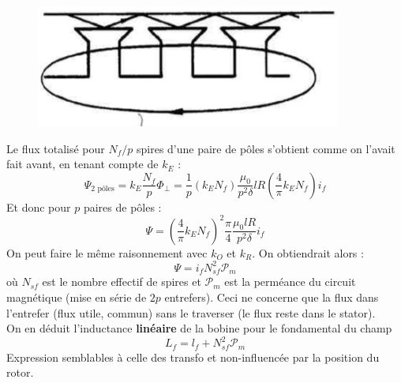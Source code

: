 	\begin{figure}
	\vspace{-8mm}
	\includegraphics[scale=0.45]{ch5/image14.png}
	\end{figure}
	Le flux totalisé pour $N_f/p$ spires d'une paire de pôles s'obtient comme on 
	l'avait fait avant, en tenant compte de $k_E$ :
	\begin{equation}
	\Psi_{\text{2 pôles}} = k_E\dfrac{N_f}{p}\Phi_\perp = \dfrac{1}{p}(k_EN_f)
	\dfrac{\mu_0}{p^2\delta}lR\left(\dfrac{4}{\pi}k_EN_f\right)i_f
	\end{equation}
	Et donc pour $p$ paires de pôles :
	\begin{equation}
	\Psi = \left(\dfrac{4}{\pi}k_EN_f\right)^2\dfrac{\pi}{4}\dfrac{\mu_0lR}{p^2\delta}
	i_f
	\end{equation}
	On peut faire le même raisonnement avec $k_O$ et $k_R$. On obtiendrait alors :
	\begin{equation}
	\Psi = i_fN_{sf}^2\mathcal{P}_m
	\end{equation}
	où $N_{sf}$ est le nombre effectif de spires et $\mathcal{P}_m$ est la perméance 
	du circuit magnétique (mise en série de $2p$ entrefers). Ceci ne concerne que 
	la flux dans l’entrefer (flux utile, commun) sans le traverser (le flux reste 
	dans le stator). \\
	On en déduit l'inductance \textbf{linéaire} de la bobine pour le fondamental du 
	champ
	\begin{equation}
	L_f = l_f + N_{sf}^2\mathcal{P}_m
	\end{equation}
	Expression semblables à celle des transfo et non-influencée par la position du
	rotor.
	
	

